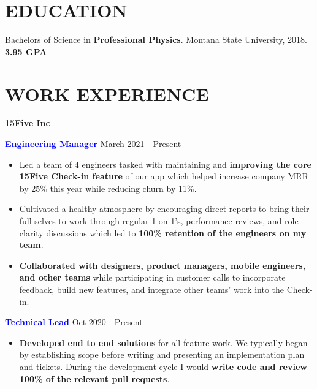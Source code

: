 \documentclass[11pt]{resume}
\begin{document}
    \vspace{-1em}
    \noindent\begin{minipage}[t]{1\textwidth}
      {\section* {\large{EDUCATION}}}
      Bachelors of Science in {\bf Professional Physics}. Montana State University,
      2018.
      {\bf 3.95 GPA}

      {\section* {\large{WORK EXPERIENCE}}}
      \vspace{-.25em}
      {\bf 15Five Inc}
      \vspace{.25em}
      \begin{addmargin}[.5em]{0em}
        {\bf \textcolor{blue}{Engineering Manager}} {\hfill March 2021 - Present}
        \vspace{-.5em}
        \begin{itemize}
            \setlength\itemsep{-.2em}
            \item {Led a team of 4 engineers tasked with maintaining and {\bf
                  improving the core 15Five Check-in feature} of our app which
                  helped increase company MRR by 25\% this year while reducing churn
                  by 11\%.}
            \item {Cultivated a healthy atmosphere by encouraging direct
                  reports to bring their full selves to work through regular
                  1-on-1's, performance reviews, and role clarity discussions
                  which led to {\bf 100\% retention of the engineers on my team}.}
            \item {{\bf Collaborated with designers, product managers, mobile
                  engineers, and other teams} while participating in customer calls
                  to incorporate feedback, build new features, and integrate other
                  teams' work into the Check-in.}
        \end{itemize}

        {\bf \textcolor{blue}{Technical Lead}} {\hfill Oct 2020 - Present}
        \vspace{-.5em}
        \begin{itemize}
            \setlength\itemsep{-.2em}
            \item {{\bf Developed end to end solutions} for all feature work. We
                  typically began by establishing scope before writing and
                  presenting an implementation plan and tickets. During the
                  development cycle I would {\bf write code and review
                  100\% of the relevant pull requests}.}


\end{itemize}
\end{addmargin}
\end{minipage}
\end{document}
